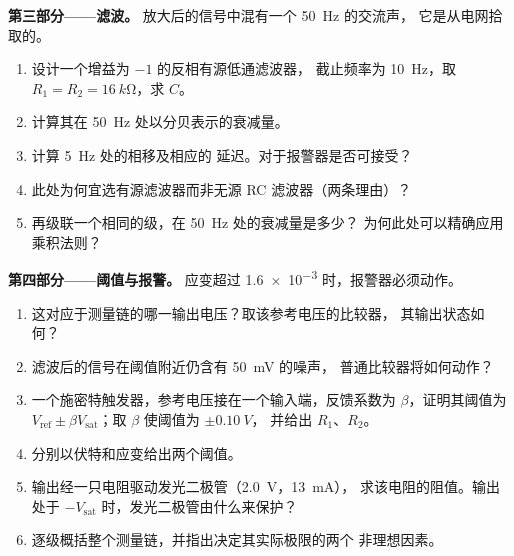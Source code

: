 \begin{problem}
\medskip
\noindent\textbf{第三部分——滤波。}
放大后的信号中混有一个 \qty{50}{Hz} 的交流声，
它是从电网拾取的。
\begin{enumerate}[resume]
  \item 设计一个增益为 $-1$ 的反相有源低通滤波器，
        截止频率为 \qty{10}{Hz}，取 $R_1 = R_2 = \qty{16}{k\ohm}$，求 $C$。
  \item 计算其在 \qty{50}{Hz} 处以分贝表示的衰减量。
  \item 计算 \qty{5}{Hz} 处的相移及相应的
        延迟。对于报警器是否可接受？
  \item 此处为何宜选有源滤波器而非无源 RC
        滤波器（两条理由）？
  \item 再级联一个相同的级，在 \qty{50}{Hz} 处的衰减量是多少？
        为何此处可以精确应用乘积法则？
\end{enumerate}

\medskip
\noindent\textbf{第四部分——阈值与报警。}
应变超过 \num{1.6e-3} 时，报警器必须动作。
\begin{enumerate}[resume]
  \item 这对应于测量链的哪一输出电压？取该参考电压的比较器，
        其输出状态如何？
  \item 滤波后的信号在阈值附近仍含有 \qty{50}{mV} 的噪声，
        普通比较器将如何动作？
  \item 一个施密特触发器，参考电压接在一个输入端，反馈系数为
        $\beta$，证明其阈值为 $V_{\mathrm{ref}} \pm
        \beta V_{\mathrm{sat}}$；取 $\beta$ 使阈值为 $\pm\qty{0.10}{V}$，
        并给出 $R_1$、$R_2$。
  \item 分别以伏特和应变给出两个阈值。
  \item 输出经一只电阻驱动发光二极管（\qty{2.0}{V}，\qty{13}{mA}），
        求该电阻的阻值。输出处于
        $-V_{\mathrm{sat}}$ 时，发光二极管由什么来保护？
  \item 逐级概括整个测量链，并指出决定其实际极限的两个
        非理想因素。
\end{enumerate}
\end{problem}
